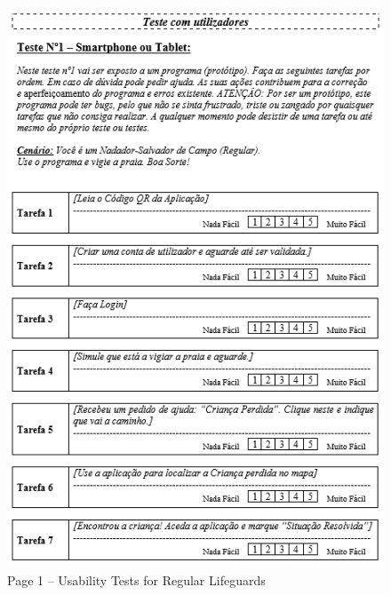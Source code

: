 \begin{figure}[H]
  \centering
  \includegraphics[width=14cm]{figs/UsabilityTest_Regular_1.png}
  \caption{Page 1 – Usability Tests for Regular Lifeguards}
  \label{fig:UsabilityTest_Regular_1}
\end{figure}
